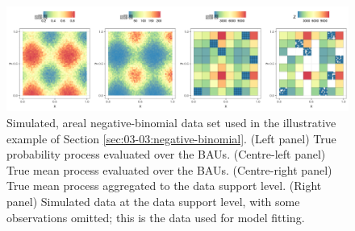 \documentclass[article]{jss}
\newcommand{\fct}[1]{\code{#1()}}
\begin{document}
\begin{figure}[t!]
    \centering
    \includegraphics[width = \linewidth]{img/Negbinom_sim_data.png}
    \caption{Simulated, areal negative-binomial data set used in the illustrative example of Section \ref{sec:03-03:negative-binomial}. 
    (Left panel) True probability process evaluated over the BAUs. 
    (Centre-left panel) True mean process evaluated over the BAUs. 
    (Centre-right panel) True mean process aggregated to the data support level. 
    (Right panel) Simulated data at the data support level, with some observations omitted; this is the data used for model fitting.  
}   
  \label{fig:03-02-negative-binomial_data}
\end{figure}



\end{document}
